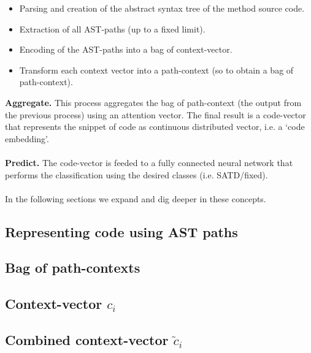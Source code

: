\begin{itemize}
    \item Parsing and creation of the abstract syntax tree of the method source code. 
    \item Extraction of all AST-paths (up to a fixed limit).
    \item Encoding of the AST-paths into a bag of context-vector.
    \item Transform each context vector into a path-context (so to obtain a bag of path-context).
\end{itemize}

\noindent \textbf{Aggregate.} This process aggregates the bag of path-context (the output from the previous process) using an attention vector. The final result is a code-vector that represents the snippet of code as continuous distributed vector, i.e. a `code embedding'.
\\
\\
\noindent \textbf{Predict.} The code-vector is feeded to a fully connected neural network that performs the classification using the desired classes (i.e. SATD/fixed).
\\
\\
\noindent In the following sections we expand and dig deeper in these concepts.


\subsection{Representing code using AST paths}


\subsection{Bag of path-contexts}

\subsection{Context-vector $c_i$}

\subsection{Combined context-vector $\widetilde{c}_i$}

